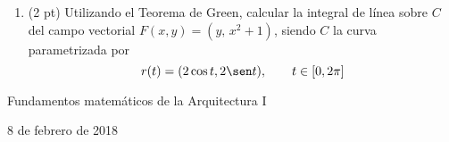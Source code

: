\documentclass[a4paper, 12pt]{article}
\begin{document}
\begin{enumerate}
\item (2 pt)
Utilizando el Teorema de Green, calcular la integral de línea sobre $C$ del campo vectorial $F(x,y)=(y,\, x^2+1)$, siendo $C$ la curva parametrizada por
$$
r(t)=(2\cos t, 2\sen t),\qquad t\in[0, 2\pi]
$$
\vskip 6mm



\end{enumerate}



\pagebreak


\begin{center}
\LARGE
Fundamentos matemáticos de la Arquitectura I

\Large
8 de febrero de 2018

\end{center}

\end{document}
